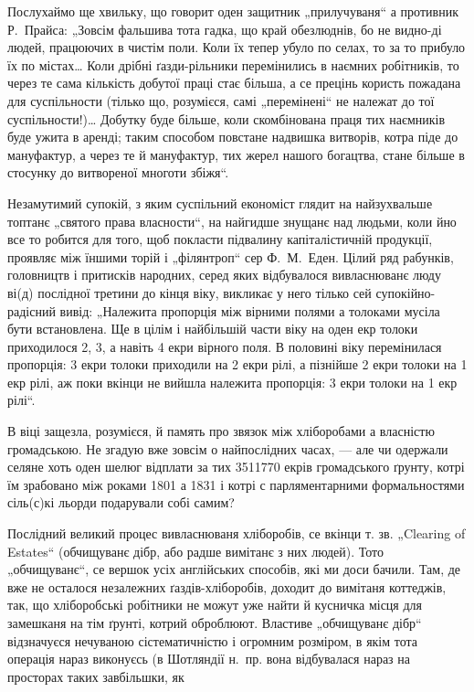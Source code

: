 
Послухаймо ще хвильку, що говорит оден защитник „прилучуваня“ а противник Р.~Прайса: „Зовсім
фальшива тота гадка, що край обезлюднів, бо не видно-ді людей, працюючих в чистім поли. Коли їх
тепер убуло по селах, то за то прибуло їх по містах\dots{} Коли дрібні ґазди-рільники перемінились в
наємних робітників, то через те сама кількість добутої праці стає більша, а се прецінь користь
пожадана для суспільности (тілько що, розумієся, самі „перемінені“ не належат до тої
суспільности!)\dots{} Добутку буде більше, коли скомбінована праця тих наємників буде ужита в 
аренді; таким способом повстане надвишка витворів, котра піде до мануфактур, а через те й
мануфактур, тих жерел нашого богацтва, стане більше в стосунку до витвореної многоти збіжя“.

Незамутимий супокій, з яким суспільний економіст глядит на найзухвальше топтанє „святого права
власности“, на найгидше знущанє над людьми, коли йно все то робится для того, щоб покласти підвалину
капіталістичній продукції, проявляє між їншими торій і „філянтроп“ сер Ф.~М.~Еден. Цілий ряд
рабунків, головництв і притисків народних, серед яких відбувалося вивласнюванє люду ві(д) послідної
третини  до кінця  віку, викликає у него тілько сей супокійно-радісний вивід: „Належита
пропорція між вірними полями а толоками мусіла бути встановлена. Ще в цілім  і найбільшій части
 віку на оден екр толоки приходилося 2, 3, а навіть 4 екри вірного поля. В половині  віку
перемінилася пропорція: 3 екри толоки приходили на 2 екри рілі, а пізнійше 2 екри толоки на 1 екр
рілі, аж поки вкінци не вийшла належита пропорція: 3 екри толоки на 1 екр рілі“.

В  віці защезла, розумієся, й память про звязок між хліборобами а власністю громадською. Не
згадую вже зовсім о найпослідних часах, — але чи одержали селяне хоть оден шелюг відплати за тих
\num{3511770} екрів громадського ґрунту, котрі їм зрабовано між роками 1801 а 1831 і котрі с
парляментарними формальностями сіль(с)кі льорди подарували собі самим?

Послідний великий процес вивласнюваня хліборобів, се вкінци т. зв. „\textenglish{Clearing of Estates}“ (обчищуванє
дібр, або радше вимітанє з них людей). Тото „обчищуванє“, се вершок усіх англійських способів, які
ми доси бачили. Там, де вже не осталося незалежних ґаздів-хліборобів, доходит до вимітаня коттеджів,
так, що хліборобські робітники не можут уже найти й кусничка місця для замешканя на тім ґрунті,
котрий оброблюют. Властиве „обчищуванє дібр“ відзначуєся нечуваною сістематичністю і огромним
розміром, в якім тота операція нараз виконуєсь (в Шотляндії н.~пр.
вона відбувалася нараз на просторах таких завбільшки, як
\parbreak{}
